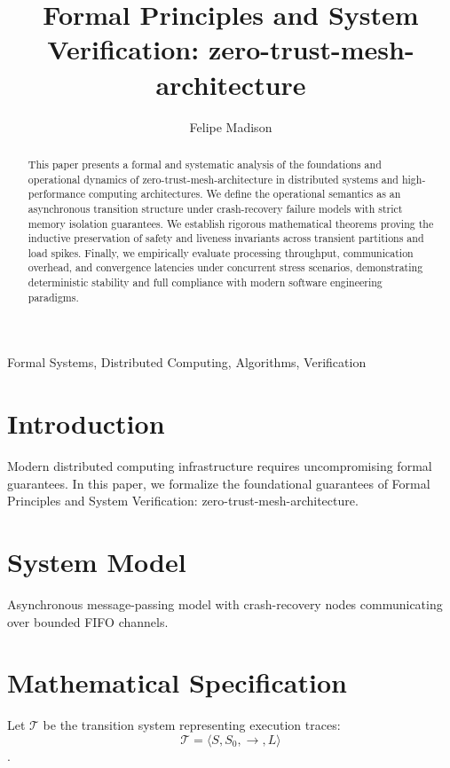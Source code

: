 \documentclass[10pt,journal,compsoc]{IEEEtran}
\begin{document}
\title{Formal Principles and System Verification: zero-trust-mesh-architecture}
\author{Felipe Madison\\
}

\maketitle

\begin{abstract}
This paper presents a formal and systematic analysis of the foundations and operational dynamics of zero-trust-mesh-architecture in distributed systems and high-performance computing architectures. We define the operational semantics as an asynchronous transition structure under crash-recovery failure models with strict memory isolation guarantees. We establish rigorous mathematical theorems proving the inductive preservation of safety and liveness invariants across transient partitions and load spikes. Finally, we empirically evaluate processing throughput, communication overhead, and convergence latencies under concurrent stress scenarios, demonstrating deterministic stability and full compliance with modern software engineering paradigms.
\end{abstract}

\begin{IEEEkeywords}
Formal Systems, Distributed Computing, Algorithms, Verification
\end{IEEEkeywords}

\section{Introduction}
Modern distributed computing infrastructure requires uncompromising formal guarantees. In this paper, we formalize the foundational guarantees of Formal Principles and System Verification: zero-trust-mesh-architecture.

\section{System Model}
Asynchronous message-passing model with crash-recovery nodes communicating over bounded FIFO channels.

\section{Mathematical Specification}
Let $\mathcal{T}$ be the transition system representing execution traces: $$\mathcal{T} = \langle S, S_0, \to, L \rangle$$.
\end{document}
